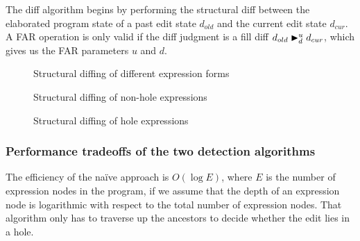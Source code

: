 The diff algorithm begins by performing the structural diff between the elaborated program state of a past edit state $d_{old}$ and the current edit state $d_{cur}$. A FAR operation is only valid if the diff judgment is a fill diff $\fdiff{d_{old}}{d_{cur}}{u}{d}$, which gives us the FAR parameters $u$ and $d$.

\begin{figure}
  \centering
  \begin{mdframed}
    \begin{singlespace}
      
    \end{singlespace}
  \end{mdframed}
  \caption{Structural diffing of different expression forms}
  \label{fig:structural-diff-diff}
\end{figure}

\begin{figure}
  \centering
  \begin{mdframed}
    \begin{singlespace}
      
    \end{singlespace}
  \end{mdframed}
  \caption{Structural diffing of non-hole expressions}
  \label{fig:structural-diff-non-holes}
\end{figure}

\begin{figure}
  \centering
  \begin{mdframed}
    \begin{singlespace}
      
    \end{singlespace}
  \end{mdframed}
  \caption{Structural diffing of hole expressions}
  \label{fig:structural-diff-holes}
\end{figure}

\subsubsection{Performance tradeoffs of the two detection algorithms}
\label{sec:far-detect-compare}

The efficiency of the na\"ive approach is $O(\log E)$, where $E$ is the number of expression nodes in the program, if we assume that the depth of an expression node is logarithmic with respect to the total number of expression nodes. That algorithm only has to traverse up the ancestors to decide whether the edit lies in a hole.

